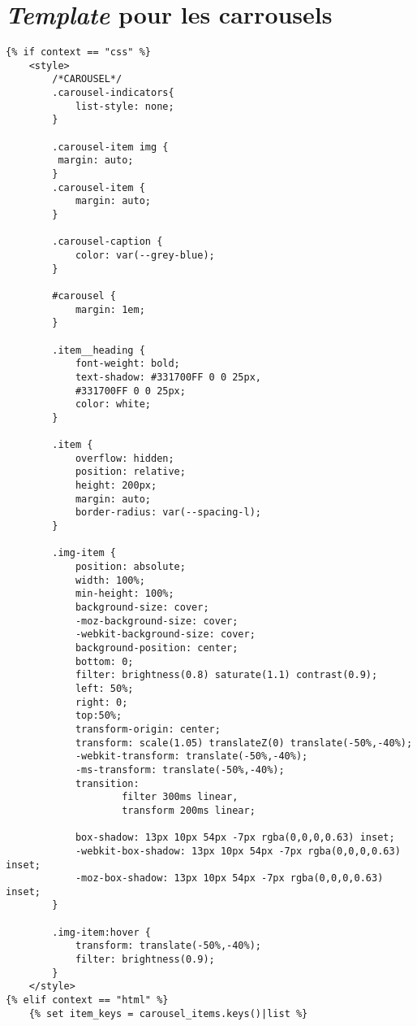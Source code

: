 \documentclass{article}
\begin{document}
\section{\textit{Template} pour les carrousels}
\begin{verbatim}
{% if context == "css" %}
    <style>
        /*CAROUSEL*/
        .carousel-indicators{
            list-style: none;
        }

        .carousel-item img {
         margin: auto;
        }
        .carousel-item {
            margin: auto;
        }

        .carousel-caption {
            color: var(--grey-blue);
        }

        #carousel {
            margin: 1em;
        }

        .item__heading {
            font-weight: bold;
            text-shadow: #331700FF 0 0 25px,
            #331700FF 0 0 25px;
            color: white;
        }

        .item {
            overflow: hidden;
            position: relative;
            height: 200px;
            margin: auto;
            border-radius: var(--spacing-l);
        }

        .img-item {
            position: absolute;
            width: 100%;
            min-height: 100%;
            background-size: cover;
            -moz-background-size: cover;
            -webkit-background-size: cover;
            background-position: center;
            bottom: 0;
            filter: brightness(0.8) saturate(1.1) contrast(0.9);
            left: 50%;
            right: 0;
            top:50%;
            transform-origin: center;
            transform: scale(1.05) translateZ(0) translate(-50%,-40%);
            -webkit-transform: translate(-50%,-40%);
            -ms-transform: translate(-50%,-40%);
            transition:
                    filter 300ms linear,
                    transform 200ms linear;

            box-shadow: 13px 10px 54px -7px rgba(0,0,0,0.63) inset;
            -webkit-box-shadow: 13px 10px 54px -7px rgba(0,0,0,0.63) inset;
            -moz-box-shadow: 13px 10px 54px -7px rgba(0,0,0,0.63) inset;
        }

        .img-item:hover {
            transform: translate(-50%,-40%);
            filter: brightness(0.9);
        }
    </style>
{% elif context == "html" %}
    {% set item_keys = carousel_items.keys()|list %}


\end{verbatim}
\end{document}
